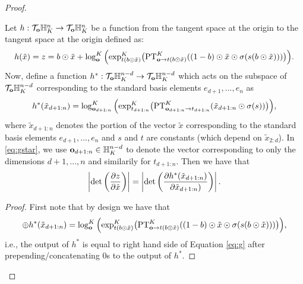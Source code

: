 \begin{proof}
\begin{lemma}
Let $h : \mathcal{T}_{\mathbf{o}}\mathbb{H}^n_K \rightarrow \mathcal{T}_{\mathbf{o}}\mathbb{H}^n_K$ be a function from the tangent space at the origin to the tangent space at the origin defined as:
\begin{equation}\label{eq:g}
h(\tilde{x}) = z = b \odot \tilde{
    x} + \log^K_{\textbf{o}}\Big( \textnormal{exp}^K_{t(b \odot \tilde{x})}\big(\textnormal{PT}^K_{\textbf{o}\to t(b \odot \tilde{x}) }((1-b) \odot \tilde{x} \odot \sigma(s(b \odot \tilde{x})))\big)\Big).
\end{equation}
Now, define a function $h^* : \mathcal{T}_{\mathbf{o}}\mathbb{H}^{n-d}_K \rightarrow \mathcal{T}_{\mathbf{o}}\mathbb{H}^{n-d}_K$ which acts on the subspace of $\mathcal{T}_{\mathbf{o}}\mathbb{H}^{n-d}_K$ corresponding to the standard basis elements $e_{d+1}, ..., e_n$ as
\begin{equation}\label{eq:gstar}
h^*(\tilde{x}_{d+1:n}) =   \log^K_{\mathbf{o}_{d+1:n}}\Big( \textnormal{exp}^K_{t_{d+1:n}}\big(\textnormal{PT}^K_{\mathbf{o}_{d+1:n} \to t_{d+1:n}}( \tilde{x}_{d+1:n} \odot \sigma(s))\big)\Big),
\end{equation}
where $\tilde{x}_{d+1:n}$ denotes the portion of the vector $\tilde{x}$ corresponding to the standard basis elements $e_{d+1}, ..., e_n$ and $s$ and $t$ are constants (which depend on $\tilde{x}_{2:d}$).
In \eqref{eq:gstar}, we use $\mathbf{o}_{d+1:n} \in \mathbb{H}^{n-d}_K$ to denote the vector corresponding to only the dimensions $d+1, ..., n$ and similarily for $t_{d+1:n}$.
Then we have that
\begin{equation}
    \left|\textnormal{det}\left(\frac{\partial z}{\partial \tilde{x}}\right)\right| =    \left|\textnormal{det}\left(\frac{\partial h^*(\tilde{x}_{d+1:n})}{\partial \tilde{x}_{d+1:n})}\right)\right|.
\end{equation}
\end{lemma}
\begin{proof}
First note that by design we have that 
\begin{equation}
    [0,0..,0] \oplus h^*(\tilde{x}_{d+1:n}) = \log^K_{\textbf{o}}\Big( \textnormal{exp}^K_{t(b \odot \tilde{x})}\big(\textnormal{PT}^K_{\textbf{o}\to t(b \odot \tilde{x}) }((1-b) \odot \tilde{x} \odot \sigma(s(b \odot \tilde{x})))\big)\Big),
\end{equation}
i.e., the output of $h^*$ is equal to right hand side of Equation \eqref{eq:g} after prepending/concatenating 0s to the output of $h^*$. 


\end{proof}
\end{proof}
